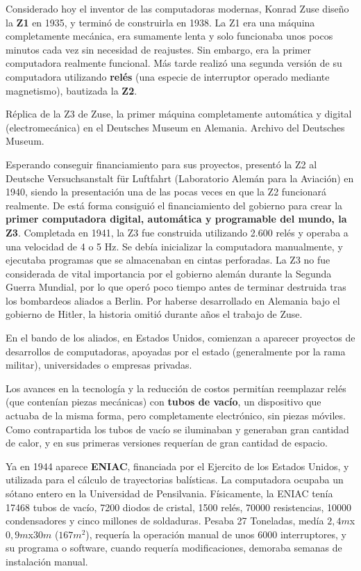 Considerado hoy el inventor de las computadoras modernas, Konrad Zuse diseño
la \textbf{Z1} en 1935, y terminó de construirla en 1938. La Z1 era una máquina
completamente mecánica, era sumamente lenta y solo funcionaba unos pocos
minutos cada vez sin necesidad de reajustes. Sin embargo, era la primer
computadora realmente funcional. Más tarde realizó una segunda versión de su
computadora utilizando \textbf{relés} (una especie de interruptor operado
mediante magnetismo), bautizada la \textbf{Z2}.

{Réplica de la Z3 de Zuse, la primer máquina completamente automática y
digital (electromecánica) en el Deutsches Museum en Alemania.}
{Archivo del Deutsches Museum.}

Esperando conseguir financiamiento para sus proyectos, presentó la Z2 al
Deutsche Versuchsanstalt f\"{u}r Luftfahrt (Laboratorio Alemán para la Aviación)
en 1940, siendo la presentación una de las pocas veces en que la Z2 funcionará
realmente. De está forma consiguió el financiamiento del gobierno para crear la
\textbf{primer computadora digital, automática y programable del mundo, la Z3}.
Completada en 1941, la Z3 fue construida utilizando 2.600 relés y operaba a una
velocidad de 4 o 5 Hz. Se debía inicializar la computadora manualmente, y
ejecutaba programas que se almacenaban en cintas perforadas. La Z3 no fue
considerada de vital importancia por el gobierno alemán durante la Segunda
Guerra Mundial, por lo que operó poco tiempo antes de terminar destruida tras
los bombardeos aliados a Berlin. Por haberse desarrollado en Alemania bajo el
gobierno de Hitler, la historia omitió durante años el trabajo de Zuse.
\autocite[cap. I]{ceruzzi_2003}

En el bando de los aliados, en Estados Unidos, comienzan a aparecer proyectos de
desarrollos de computadoras, apoyadas por el estado (generalmente por la rama
militar), universidades o empresas privadas.

Los avances en la tecnología y la reducción de costos permitían reemplazar relés
(que contenían piezas mecánicas) con \textbf{tubos de vacío}, un dispositivo que
actuaba de la misma forma, pero completamente electrónico, sin piezas móviles.
Como contrapartida los tubos de vacío se iluminaban y generaban gran cantidad de
calor, y en sus primeras versiones requerían de gran cantidad de espacio.

Ya en 1944 aparece \textbf{ENIAC}, financiada por el Ejercito de los
Estados Unidos, y utilizada para el cálculo de trayectorias balísticas. La
computadora ocupaba un sótano entero en la Universidad de Pensilvania.
Físicamente, la ENIAC tenía 17468 tubos de vacío, 7200 diodos de cristal,
1500 relés, 70000 resistencias, 10000 condensadores y cinco millones de
soldaduras. Pesaba 27 Toneladas, medía $2,4m$x$0,9m$x$30m$ ($167m^2$), requería
la operación manual de unos 6000 interruptores, y su programa o software, cuando
requería modificaciones, demoraba semanas de instalación manual.
\autocite[p. 59]{ceruzzi_2012}

